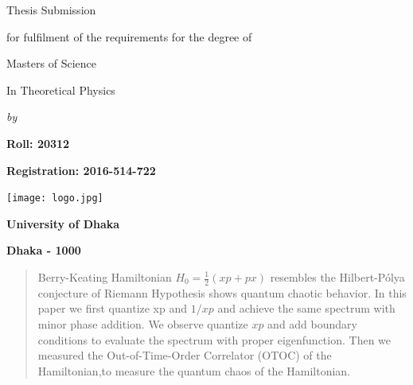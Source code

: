 \documentclass[12pt]{report}
\newcommand*{\1}{\hspace{1pt}}
\begin{document}
    \begin{center}
        \centering
        \thispagestyle{empty}
        \begin{center}
        \end{center}
        \large\begin{center}Thesis Submission\end{center}
        \large\begin{center}for fulfilment of the requirements for the degree of\end{center}
        \large
        {\bf{
        \begin{center}Masters of Science\end{center}
        }
        }
        \large 
        {\bf{
        \begin{center}In Theoretical Physics\end{center}
        }
        }
        \large\begin{center}\textit{by}\end{center}
        \large\begin{center}\bf Roll: 20312 \end{center}
        \large\begin{center}\bf{Registration: 2016-514-722}\end{center}
        \vspace*{1\baselineskip}
        \begin{center}\texttt{[image: logo.jpg]}\end{center}
        \large\begin{center}\bf{University of Dhaka}\end{center}
        \large\begin{center}\bf{Dhaka - 1000}\end{center}
    \end{center}
    \doublespacing
    \newpage
    
    \begin{abstract}
        Berry-Keating Hamiltonian $H_{0}=\frac{1}{2}(xp+px)$ resembles the Hilbert-Pólya
        conjecture of Riemann Hypothesis shows quantum chaotic behavior. In
        this paper we first quantize xp and $1/xp$ and achieve the same spectrum
        with minor phase addition. We observe quantize $xp$ and add boundary
        conditions to evaluate the spectrum with proper eigenfunction. Then we measured the
        Out-of-Time-Order Correlator (OTOC) of the Hamiltonian,to measure the quantum chaos of the Hamiltonian.
    \end{abstract}
    \newpage
\renewcommand\contentsname{Table of Contents}
\end{document}
